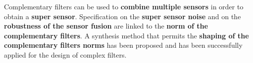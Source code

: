 
Complementary filters can be used to \textbf{combine multiple sensors} in order
to obtain a \textbf{super sensor}.
Specification on the \textbf{super sensor noise} and on the \textbf{robustness
  of the sensor fusion} are linked to the \textbf{norm of the complementary filters}.
A synthesis method that permits the \textbf{shaping of the complementary filters
  norms} has been proposed and has been successfully applied for the design of
complex filters.
